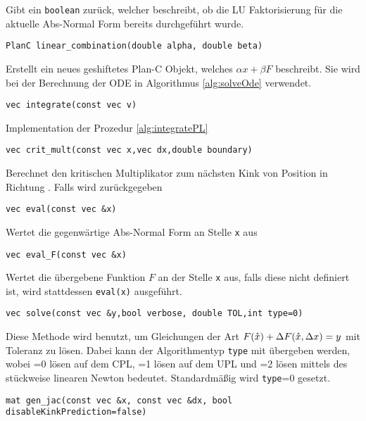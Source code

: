 Gibt ein \texttt{boolean} zurück, welcher beschreibt, ob die LU Faktorisierung für die aktuelle Abs-Normal Form bereits durchgeführt wurde.
\begin{lstlisting}[numbers=none]
PlanC linear_combination(double alpha, double beta)
\end{lstlisting}
Erstellt ein neues geshiftetes Plan-C Objekt, welches $\alpha x + \beta F$ beschreibt. Sie wird bei der Berechnung der ODE in Algorithmus \ref{alg:solveOde} verwendet.
\begin{lstlisting}[numbers=none]
vec integrate(const vec v)
\end{lstlisting}
Implementation der Prozedur \ref{alg:integratePL}
\begin{lstlisting}[numbers=none]
vec crit_mult(const vec x,vec dx,double boundary)
\end{lstlisting}
Berechnet den kritischen Multiplikator zum nächsten Kink von Position  in Richtung . Falls  wird  zurückgegeben
\begin{lstlisting}[numbers=none]
vec eval(const vec &x)
\end{lstlisting}
Wertet die gegenwärtige Abs-Normal Form an Stelle \texttt{x} aus
\begin{lstlisting}[numbers=none]
vec eval_F(const vec &x)
\end{lstlisting}
Wertet die übergebene Funktion $F$ an der Stelle \texttt{x} aus, falls diese nicht definiert ist, wird stattdessen \texttt{eval(x)} ausgeführt.
\begin{lstlisting}[numbers=none]
vec solve(const vec &y,bool verbose, double TOL,int type=0)
\end{lstlisting}
Diese Methode wird benutzt, um Gleichungen der Art $F(\mathring{x})+\Delta F(\mathring{x},\Delta x) = y$ mit Toleranz  zu lösen. Dabei kann der Algorithmentyp \texttt{type} mit übergeben werden, wobei =0 lösen auf dem CPL, =1 lösen auf dem UPL und =2 lösen mittels des stückweise linearen Newton bedeutet. Standardmäßig wird \texttt{type}=0 gesetzt.    
\begin{lstlisting}[numbers=none]
mat gen_jac(const vec &x, const vec &dx, bool disableKinkPrediction=false)
\end{lstlisting}

